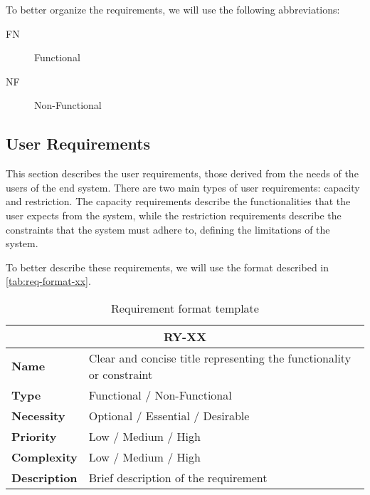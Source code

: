 To better organize the requirements, we will use the following abbreviations:

\begin{description}
    \item[FN]  Functional
    \item[NF]  Non-Functional
\end{description}

\subsection{User Requirements}\label{sec:user-requirements}
This section describes the user requirements, those derived from the needs of the users of the end system. There are two main types of user requirements: capacity and restriction. The capacity requirements describe the functionalities that the user expects from the system, while the restriction requirements describe the constraints that the system must adhere to, defining the limitations of the system.

To better describe these requirements, we will use the format described in \autoref{tab:req-format-xx}.

\begin{table}[H]
    \centering
    \begin{tabular}{l p{10cm}}
        \toprule
        \multicolumn{2}{c}{\textbf{RY-XX}} \\
        \toprule
        \textbf{Name}               & Clear and concise title representing the functionality or constraint \\
        \textbf{Type}               & Functional / Non-Functional \\
        \textbf{Necessity}          & Optional / Essential / Desirable \\
        \textbf{Priority}           & Low / Medium / High \\
        \textbf{Complexity}         & Low / Medium / High \\
        \textbf{Description}        & Brief description of the requirement \\
        \bottomrule
    \end{tabular}
\caption{Requirement format template}\label{tab:req-format-xx}
\end{table}

